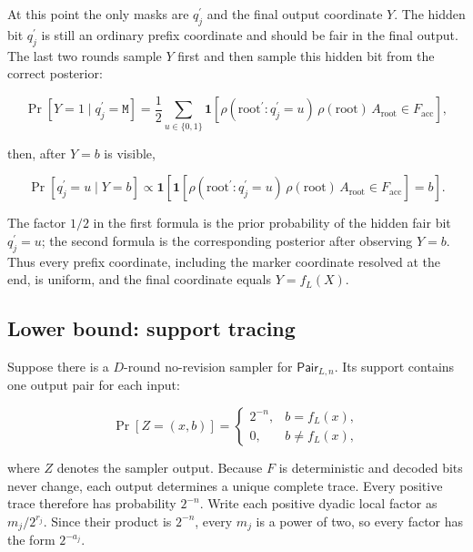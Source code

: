 \documentclass[10pt]{article}
\theoremstyle{definition}
\newcommand{\Pair}{\mathsf{Pair}}
\newcommand{\bits}{\{0,1\}}
\newcommand{\mask}{\mathtt{M}}
\newcommand{\ind}{\mathbf{1}}
\begin{document}
At this point the only masks are $q^{\prime}_j$ and the final output
coordinate $Y$.  The hidden bit $q^{\prime}_j$ is still an ordinary prefix
coordinate and should be fair in the final output.  The last two rounds sample
$Y$ first and then sample this hidden bit from the correct posterior:

\begin{equation}
 \Pr[Y=1\mid q^{\prime}_j=\mask]
 =
 \frac12
 \sum_{u\in\bits}
 \ind\!\left[
   \rho(\mathrm{root}^{\prime}\!:\!q^{\prime}_j=u)\,
   \rho(\mathrm{root})\,A_{\mathrm{root}}\in F_{\mathrm{acc}}
 \right],
\end{equation}

then, after $Y=b$ is visible,

\begin{equation}
 \Pr[q^{\prime}_j=u\mid Y=b]
 \propto
 \ind\!\left[
   \ind\!\left[
     \rho(\mathrm{root}^{\prime}\!:\!q^{\prime}_j=u)\,
     \rho(\mathrm{root})\,A_{\mathrm{root}}\in F_{\mathrm{acc}}
   \right]=b
 \right].
\end{equation}

The factor $1/2$ in the first formula is the prior probability of the hidden
fair bit $q^{\prime}_j=u$; the second formula is the corresponding posterior
after observing $Y=b$.  Thus every prefix coordinate, including the marker
coordinate resolved at the end, is uniform, and the final coordinate equals
$Y=f_L(X)$.

\subsection{Lower bound: support tracing}

Suppose there is a $D$-round no-revision sampler for $\Pair_{L,n}$.  Its
support contains one output pair for each input:

\begin{equation}
 \Pr[Z=(x,b)]
 =
 \begin{cases}
  2^{-n}, & b=f_L(x),\\
  0, & b\ne f_L(x),
 \end{cases}
\end{equation}

where $Z$ denotes the sampler output.  Because $F$ is deterministic and
decoded bits never change, each output determines a unique complete trace.
Every positive trace therefore has probability $2^{-n}$.  Write each positive
dyadic local factor as $m_j/2^{r_j}$.  Since their product is $2^{-n}$, every
$m_j$ is a power of two, so every factor has the form $2^{-a_j}$.
\end{document}
